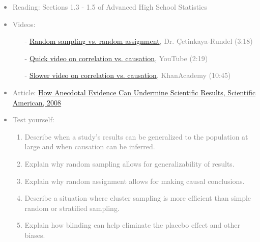 \documentclass[11pt]{article}
\newcommand{\gray}[1]{\textcolor{gray}{#1}}
\begin{document}
\gray{
{\it
\vspace{-0.75cm}
\begin{itemize}
\renewcommand{\labelitemi}{{\textcolor{dark}{$\ast$}}}
\item Reading: Sections 1.3 - 1.5 of Advanced High School Statistics
\item Videos:
\begin{itemize}
\item[-] \href{http://youtu.be/S6y4QV7Kyl4}{Random sampling vs. random assignment}, Dr. \c{C}etinkaya-Rundel (3:18)
\item[-] \href{http://www.youtube.com/watch?v=5zyruPbgxyM}{Quick video on correlation vs. causation}, YouTube (2:19)
\item[-] \href{http://www.khanacademy.org/math/statistics/v/correlation-and-causality}{Slower video on correlation vs. causation}, KhanAcademy (10:45)
\end{itemize}
\item Article: \href{http://www.scientificamerican.com/article.cfm?id=how-anecdotal-evidence-can-undermine-scientific-results}{How Anecdotal Evidence Can Undermine Scientific Results, Scientific American, 2008}
\item Test yourself: 
\begin{enumerate}
\item Describe when a study's results can be generalized to the population at large and when causation can be inferred.
\item Explain why random sampling allows for generalizability of results.
\item Explain why random assignment allows for making causal conclusions.
\item Describe a situation where cluster sampling is more efficient than simple random or stratified sampling. 
\item Explain how blinding can help eliminate the placebo effect and other biases. \\
\end{enumerate}
\end{itemize}
}}

%

\vspace{0.5cm}
\end{document}
